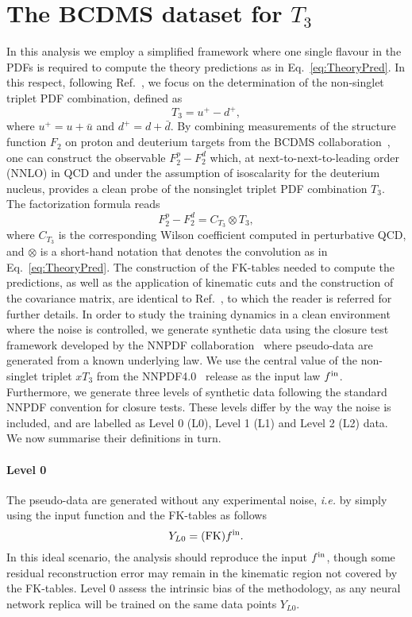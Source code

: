\appendix
\section{The BCDMS dataset for $T_3$}
\label{app:dataset}

In this analysis we employ a simplified framework where one single flavour in
the PDFs is required to compute the theory predictions as in
Eq.~\eqref{eq:TheoryPred}. In this respect, following
Ref.~\cite{Candido:2024hjt}, we focus on the determination of the non-singlet
triplet PDF combination, defined as
\begin{equation}
T_3 = u^+ - d^+,
\end{equation}
where $u^+ = u + \bar{u}$ and $d^+ = d + \bar{d}$. By combining measurements of
the structure function $F_2$ on proton and deuterium targets from the BCDMS
collaboration~\cite{Benvenuti:1989fm}, one can construct the observable $F_2^p -
F_2^d$ which, at next-to-next-to-leading order (NNLO) in QCD and under the
assumption of isoscalarity for the deuterium nucleus, provides a clean probe of
the nonsinglet triplet PDF combination $T_3$. The factorization formula reads
\begin{equation}
F_2^p - F_2^d = C_{T_3} \otimes T_3,
\end{equation}
where $C_{T_3}$ is the corresponding Wilson coefficient computed in perturbative
QCD, and $\otimes$ is a short-hand notation that denotes the convolution as in
Eq.~\eqref{eq:TheoryPred}. The construction of the FK-tables needed to compute
the predictions, as well as the application of kinematic cuts and the
construction of the covariance matrix, are identical to
Ref.~\cite{Candido:2024hjt}, to which the reader is referred for further
details. In order to study the training dynamics in a clean environment where the
noise is controlled, we generate synthetic data using the closure test framework
developed by the NNPDF collaboration~\cite{NNPDF:2021njg,DelDebbio:2021whr}
where pseudo-data are generated from a known underlying law. We use the central
value of the non-singlet triplet $xT_3$ from the NNPDF4.0~\cite{NNPDF:2021njg}
release as the input law $f^{\rm in}$. Furthermore, we generate three levels of
synthetic data following the standard NNPDF convention for closure tests. These
levels differ by the way the noise is included, and are labelled as Level 0 (L0),
Level 1 (L1) and Level 2 (L2) data. We now summarise their definitions in turn.

\paragraph{Level 0}
The pseudo-data are generated without any experimental noise, \textit{i.e.} by simply using
the input function and the FK-tables as follows
\begin{equation}
Y_{L0} =  (\mathrm{FK}) f^{\rm in}.
\end{equation}
In this ideal scenario, the analysis should reproduce the input $f^{\rm in}$, though
some residual reconstruction error may remain in the kinematic region not
covered by the FK-tables. Level 0 assess the intrinsic bias of the methodology,
as any neural network replica will be trained on the same data points $Y_{L0}$.

